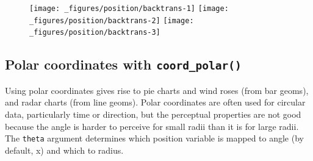 \begin{Shaded}
\begin{Highlighting}[]
\StringTok{ }\StringTok{ }
\StringTok{  }\NormalTok{() +}\StringTok{ }
\StringTok{  }\NormalTok{(} \NormalTok{) +}\StringTok{ }
\StringTok{  }\NormalTok{(}\NormalTok{) +}\StringTok{ }
\StringTok{  }\NormalTok{(}\NormalTok{) +}\StringTok{ }
\StringTok{  }\NormalTok{(} \NormalTok{)}

\StringTok{  }\NormalTok{() +}\StringTok{ }
\StringTok{  }\NormalTok{()}

\StringTok{ }\NormalTok{(}\NormalTok{)}
\StringTok{  }\NormalTok{() +}\StringTok{ }
\StringTok{  }\NormalTok{() +}\StringTok{ }
\StringTok{  }\NormalTok{(}  
\end{Highlighting}
\end{Shaded}

\begin{figure}[H]
  \texttt{[image: \_figures/position/backtrans-1]}%
  \texttt{[image: \_figures/position/backtrans-2]}%
  \texttt{[image: \_figures/position/backtrans-3]}
\end{figure}

\subsection{\texorpdfstring{Polar coordinates with
\texttt{coord\_polar()}}{Polar coordinates with coord\_polar()}}

Using polar coordinates gives rise to pie charts and wind roses (from
bar geoms), and radar charts (from line geoms). Polar coordinates are
often used for circular data, particularly time or direction, but the
perceptual properties are not good because the angle is harder to
perceive for small radii than it is for large radii. The \texttt{theta}
argument determines which position variable is mapped to angle (by
default, x) and which to radius.

